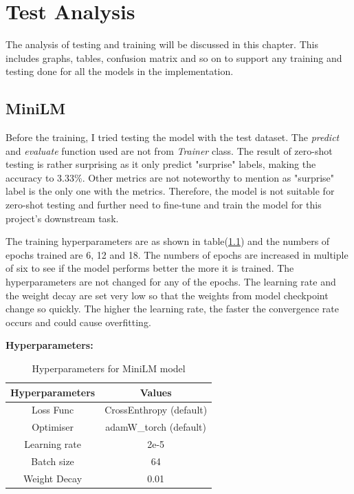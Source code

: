 
\chapter{Test Analysis}
The analysis of testing and training will be discussed in this chapter. This includes graphs, tables, confusion matrix and so on to support any training and testing done for all the models in the implementation.

\section{MiniLM}
Before the training, I tried testing the model with the test dataset. The \textit{predict} and \textit{evaluate} function used are not from \textit{Trainer} class. The result of zero-shot testing is rather surprising as it only predict "surprise" labels, making the accuracy to 3.33\%. Other metrics are not noteworthy to mention as "surprise" label is the only one with the metrics. Therefore, the model is not suitable for zero-shot testing and further need to fine-tune and train the model for this project's downstream task. 

The training hyperparameters are as shown in table(\ref{tab:hyp_MiniLM}) and the numbers of epochs trained are 6, 12 and 18. The numbers of epochs are increased in multiple of six to see if the model performs better the more it is trained. The hyperparameters are not changed for any of the epochs. The learning rate and the weight decay are set very low so that the weights from model checkpoint change so quickly. The higher the learning rate, the faster the convergence rate occurs and could cause overfitting.

\textbf{Hyperparameters:}

\begin{table}[h!]
    \centering
    \begin{tabular}{c|c}
        Hyperparameters & Values\\\hline
        Loss Func & CrossEnthropy (default)\\
        Optimiser & adamW\_torch (default)\\
        Learning rate & 2e-5\\
        Batch size & 64\\
        Weight Decay & 0.01\\
    \end{tabular}
    \caption{Hyperparameters for MiniLM model}
    \label{tab:hyp_MiniLM}
\end{table}

